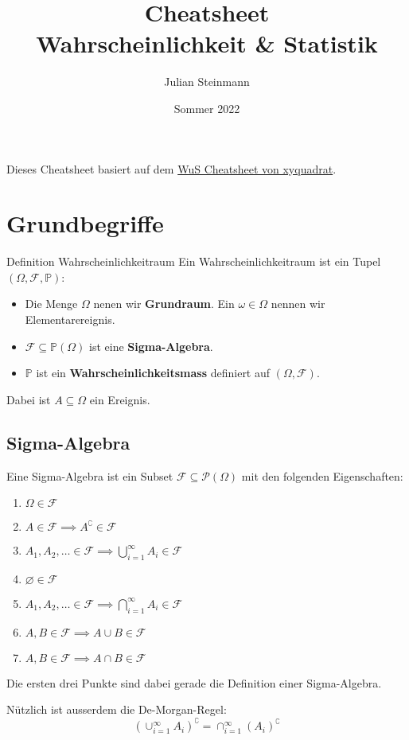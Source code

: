 \documentclass[a4paper,10pt]{article}
\title{Cheatsheet\\ Wahrscheinlichkeit \& Statistik}
\author{Julian Steinmann}
\date{\vspace{-10pt}Sommer 2022}
\def\P{\mathbb{P}}
\def\F{\mathcal{F}}
\begin{document}


Dieses Cheatsheet basiert auf dem \href{https://github.com/XYQuadrat/eth-cheatsheets}{WuS Cheatsheet von xyquadrat}.

\section{Grundbegriffe}
\begin{subbox}{Definition Wahrscheinlichkeitraum}
	Ein Wahrscheinlichkeitraum ist ein Tupel \((\Omega, \F, \P)\):
	\begin{itemize}
		\item Die Menge \(\Omega\) nenen wir \textbf{Grundraum}. Ein \(\omega \in \Omega\) nennen wir Elementarereignis.
		\item \(\F \subseteq \P(\Omega)\) ist eine \textbf{Sigma-Algebra}.
		\item \(\P\) ist ein \textbf{Wahrscheinlichkeitsmass} definiert auf \((\Omega, \F)\).
	\end{itemize}
	Dabei ist \(A \subseteq \Omega\) ein Ereignis.
\end{subbox}

\subsection{Sigma-Algebra}
Eine Sigma-Algebra ist ein Subset \(\F \subseteq \mathcal{P}(\Omega)\) mit den folgenden Eigenschaften:
\begin{enumerate}
	\item \(\Omega \in \F\)
	\item \(A \in \F \implies A^\complement \in \F\)
	\item \(A_1, A_2, \ldots \in \F \implies \bigcup_{i=1}^\infty A_i \in \F\)
	\item \(\varnothing \in \F\)
	\item \(A_1, A_2, \ldots \in \F \implies \bigcap_{i=1}^\infty A_i \in \F\)
	\item \(A, B \in \F \implies A \cup B \in \F\)
	\item \(A, B \in \F \implies A \cap B \in \F\)
\end{enumerate}
Die ersten drei Punkte sind dabei gerade die Definition einer Sigma-Algebra.

Nützlich ist ausserdem die De-Morgan-Regel: \[(\cup_{i=1}^\infty A_i)^\complement = \cap_{i=1}^\infty(A_i)^\complement\]
\end{document}

